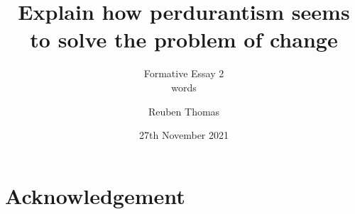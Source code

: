 \documentclass[english]{scrartcl}
\begin{document}
\title{Explain how perdurantism seems to solve the problem of change}
\subtitle{Formative Essay 2\\words}
\author{Reuben Thomas}
\date{27th November 2021}
\maketitle





\section*{Acknowledgement}

\end{document}
